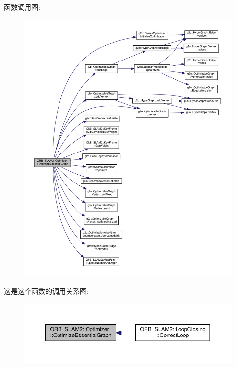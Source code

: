 函数调用图\-:
\nopagebreak
\begin{figure}[H]
\begin{center}
\leavevmode
\includegraphics[width=350pt]{classORB__SLAM2_1_1Optimizer_ad36bb1a7167c84f385c3f299bc96f20e_cgraph}
\end{center}
\end{figure}




这是这个函数的调用关系图\-:
\nopagebreak
\begin{figure}[H]
\begin{center}
\leavevmode
\includegraphics[width=350pt]{classORB__SLAM2_1_1Optimizer_ad36bb1a7167c84f385c3f299bc96f20e_icgraph}
\end{center}
\end{figure}


